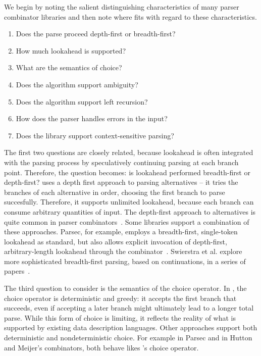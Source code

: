 We begin by noting the salient distinguishing characteristics of many parser combinator libraries and then note where \ddc{} fits with regard to these characteristics. 
\begin{enumerate}
\item Does the parse proceed depth-first or breadth-first?
\item How much lookahead is supported?
\item What are the semantics of choice?
\item Does the algorithm support ambiguity?
\item Does the algorithm support left recursion?
\item How does the parser handles errors in the input?
\item Does the library support context-sensitive parsing?
\end{enumerate}

The first two questions are closely related, because lookahead is often integrated with the parsing process by speculatively continuing parsing at each branch point. Therefore, the question becomes: is lookahead performed breadth-first or depth-first? \ddc{} uses a depth first approach to parsing alternatives -- it tries the branches of each alternative in order, choosing the first branch to parse succesfully. Therefore, it supports unlimited lookahead, because each branch can consume arbitrary quantities of input. The depth-first approach to alternatives is quite common in parser combinators~\cite{wadler:failure-successes,hutton:higher-order-parsing,hutton+:monadic-parsing,fokker:functional-parsers}. Some libraries support a combination of these approaches. Parsec, for example, employs a breadth-first, single-token lookahead as standard, but also allows explicit invocation of depth-first, arbitrary-length lookahead through the  combinator~\cite{leijen+:parsec}. Swierstra et al. explore more sophisticated breadth-first parsing, based on continuations, in a series of papers~\cite{swierstra+:fast-error-correcting,swierstra:toys-parsing,hughes+:polish-parsing}.

The third question to consider is the semantics of the choice operator. In \ddc{}, the choice operator is deterministic and greedy: it accepts the first branch that succeeds, even if accepting a later branch might ultimately lead to a longer total parse. While this form of choice is limiting, it reflects the reality of what is supported by existing data description languages. Other approaches support both deterministic and nondeterministic choice. For example  in Parsec and  in Hutton and Meijer's combinators\cite{hutton+:monadic-parsing}, both behave likes \ddc{}'s choice operator.

